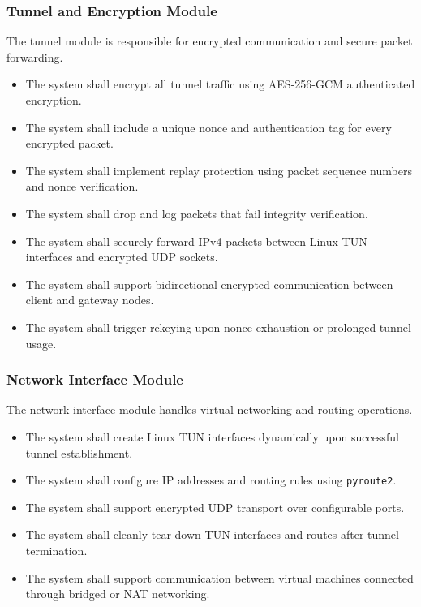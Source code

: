 \subsubsection{Tunnel and Encryption Module}

The tunnel module is responsible for encrypted communication and secure packet forwarding.

\begin{itemize}

    \item The system shall encrypt all tunnel traffic using AES-256-GCM authenticated encryption.

    \item The system shall include a unique nonce and authentication tag for every encrypted packet.

    \item The system shall implement replay protection using packet sequence numbers and nonce verification.

    \item The system shall drop and log packets that fail integrity verification.

    \item The system shall securely forward IPv4 packets between Linux TUN interfaces and encrypted UDP sockets.

    \item The system shall support bidirectional encrypted communication between client and gateway nodes.

    \item The system shall trigger rekeying upon nonce exhaustion or prolonged tunnel usage.

\end{itemize}

\subsubsection{Network Interface Module}

The network interface module handles virtual networking and routing operations.

\begin{itemize}

    \item The system shall create Linux TUN interfaces dynamically upon successful tunnel establishment.

    \item The system shall configure IP addresses and routing rules using \texttt{pyroute2}.

    \item The system shall support encrypted UDP transport over configurable ports.

    \item The system shall cleanly tear down TUN interfaces and routes after tunnel termination.

    \item The system shall support communication between virtual machines connected through bridged or NAT networking.

\end{itemize}

